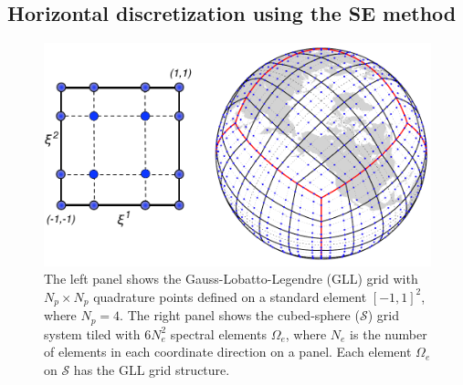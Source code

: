 \documentclass{agujournal}
\begin{document}
{\subsection{Horizontal discretization using the SE method}
  \begin{figure}[h]
\centering
 \includegraphics[scale=0.75]{figs/cs_gll4_2017}
 \caption{The left panel shows the  Gauss-Lobatto-Legendre (GLL)   grid with $ N_p \times  N_p$ quadrature points defined
 on a standard element $[-1,1]^2$, where $N_p=4$. The right panel shows the cubed-sphere ($\mathcal{S}$) grid system tiled with 
 $6 N_e^2 $ spectral elements $\Omega_e$, where $N_e$ is the number of elements  in each coordinate direction
 on a panel. 
 Each element  $\Omega_e$ on $\mathcal{S}$ has the GLL grid structure.  }
 \label{fig:gll4}
\end{figure}



}
\end{document}
